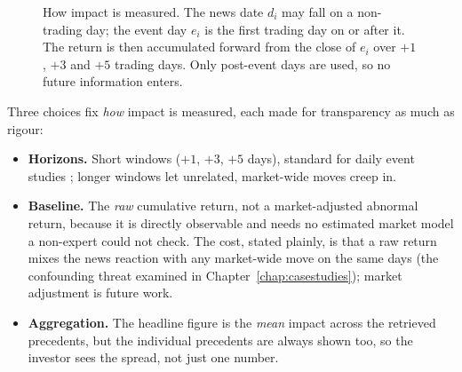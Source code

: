 \begin{figure}[ht]
\centering
{}
\caption[Event-study impact windows]{How impact is measured. The news date $d_i$ may fall on a
non-trading day; the event day $e_i$ is the first trading day on or after it. The return is then
accumulated forward from the close of $e_i$ over $+1$, $+3$ and $+5$ trading days. Only post-event days
are used, so no future information enters.}
\label{fig:eventwindow}
\end{figure}

Three choices fix \emph{how} impact is measured, each made for transparency as much as rigour:
\begin{itemize}
  \item \textbf{Horizons.} Short windows ($+1$, $+3$, $+5$ days), standard for daily event studies
        \autocite{brown1985daily}; longer windows let unrelated, market-wide moves creep in.
  \item \textbf{Baseline.} The \emph{raw} cumulative return, not a market-adjusted abnormal return, because
        it is directly observable and needs no estimated market model a non-expert could not check. The
        cost, stated plainly, is that a raw return mixes the news reaction with any market-wide move on the
        same days (the confounding threat examined in Chapter~\ref{chap:casestudies}); market adjustment is
        future work.
  \item \textbf{Aggregation.} The headline figure is the \emph{mean} impact across the retrieved
        precedents, but the individual precedents are always shown too, so the investor sees the spread, not
        just one number.
\end{itemize}

